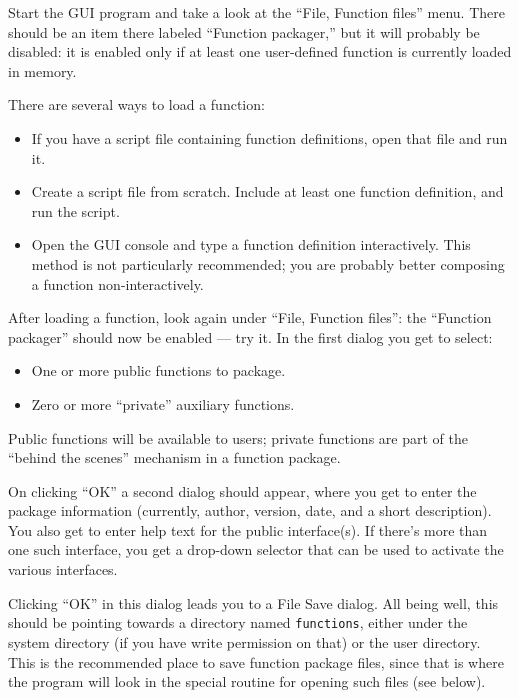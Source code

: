 Start the GUI program and take a look at the ``File, Function files'' menu.
There should be an item there labeled ``Function packager,'' but it
will probably be disabled: it is enabled only if at least one
user-defined function is currently loaded in memory.

There are several ways to load a function:

\begin{itemize}
\item If you have a script file containing function definitions, open
  that file and run it.
\item Create a script file from scratch.  Include at least one
  function definition, and run the script.
\item Open the GUI console and type a function definition
  interactively.  This method is not particularly recommended; you are
  probably better composing a function non-interactively.
\end{itemize}

After loading a function, look again under ``File, Function files'': the
``Function packager'' should now be enabled --- try it.  In the first
dialog you get to select:

\begin{itemize}
\item One or more public functions to package.
\item Zero or more ``private'' auxiliary functions.
\end{itemize}

Public functions will be available to users; private functions are
part of the ``behind the scenes'' mechanism in a function package.

On clicking ``OK'' a second dialog should appear, where you get to
enter the package information (currently, author, version, date, and a
short description).  You also get to enter help text for the public
interface(s).  If there's more than one such interface, you get a
drop-down selector that can be used to activate the various interfaces.  

Clicking ``OK'' in this dialog leads you to a File Save dialog.  All
being well, this should be pointing towards a directory named
\texttt{functions}, either under the  system directory (if
you have write permission on that) or the  user directory.
This is the recommended place to save function package files, since
that is where the program will look in the special routine for opening
such files (see below).

